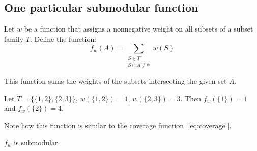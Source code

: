 \subsection{One particular submodular function}

\begin{definition}\label{def:fca}
    Let $w$ be a function that assigns a nonnegative weight on all subsets of a subset family $T$. Define the function:
    \[
        f_w(A) = \sum_{\substack{S \in T \\ S \cap A \neq \emptyset}} w(S)
    \]
\end{definition}

This function sums the weights of the subsets intersecting the given set $A$.

\begin{example}
    Let $T = \{\{1, 2\}, \{2, 3\}\}$, $w(\{1, 2\}) = 1$, $w(\{2, 3\}) = 3$. Then $f_w(\{1\}) = 1$ and $f_w(\{2\}) = 4$.
\end{example}

Note how this function is similar to the coverage function [\ref{eq:coverage}].

\begin{lemma} \label{lem:fC-submodular}
    $f_w$ is submodular.
\end{lemma}

